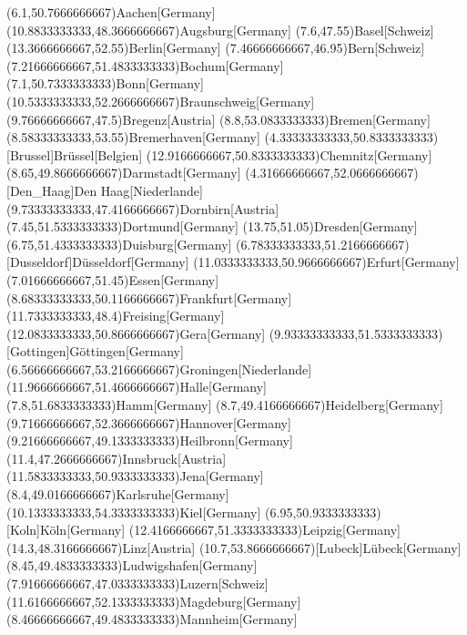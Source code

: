 \mapputIIID[30](6.1,50.7666666667){Aachen}[Germany]
\mapputIIID(10.8833333333,48.3666666667){Augsburg}[Germany]
\mapputIIID[165](7.6,47.55){Basel}[Schweiz]
\mapputIIID(13.3666666667,52.55){Berlin}[Germany]
\mapputIIID[0](7.46666666667,46.95){Bern}[Schweiz]
\mapputIIID[-30](7.21666666667,51.4833333333){Bochum}[Germany]
\mapputIIID[180](7.1,50.7333333333){Bonn}[Germany]
\mapputIIID[-90](10.5333333333,52.2666666667){Braunschweig}[Germany]
\mapputIIID(9.76666666667,47.5){Bregenz}[Austria]
\mapputIIID[-90](8.8,53.0833333333){Bremen}[Germany]
\mapputIIID[40](8.58333333333,53.55){Bremerhaven}[Germany]
\mapputIIID(4.33333333333,50.8333333333)[Brussel]{Br\"{u}ssel}[Belgien]
\mapputIIID[0](12.9166666667,50.8333333333){Chemnitz}[Germany]
\mapputIIID[0](8.65,49.8666666667){Darmstadt}[Germany]
\mapputIIID(4.31666666667,52.0666666667)[Den_Haag]{Den Haag}[Niederlande]
\mapputIIID[0](9.73333333333,47.4166666667){Dornbirn}[Austria]
\mapputIIID[0](7.45,51.5333333333){Dortmund}[Germany]
\mapputIIID[40](13.75,51.05){Dresden}[Germany]
\mapputIIID[180](6.75,51.4333333333){Duisburg}[Germany]
\mapputIIID[180](6.78333333333,51.2166666667)[Dusseldorf]{D\"{u}sseldorf}[Germany]
\mapputIIID(11.0333333333,50.9666666667){Erfurt}[Germany]
\mapputIIID[-60](7.01666666667,51.45){Essen}[Germany]
\mapputIIID(8.68333333333,50.1166666667){Frankfurt}[Germany]
\mapputIIID(11.7333333333,48.4){Freising}[Germany]
\mapputIIID(12.0833333333,50.8666666667){Gera}[Germany]
\mapputIIID(9.93333333333,51.5333333333)[Gottingen]{G\"{o}ttingen}[Germany]
\mapputIIID(6.56666666667,53.2166666667){Groningen}[Niederlande]
\mapputIIID(11.9666666667,51.4666666667){Halle}[Germany]
\mapputIIID(7.8,51.6833333333){Hamm}[Germany]
\mapputIIID[-10](8.7,49.4166666667){Heidelberg}[Germany]
\mapputIIID[200](9.71666666667,52.3666666667){Hannover}[Germany]
\mapputIIID[0](9.21666666667,49.1333333333){Heilbronn}[Germany]
\mapputIIID(11.4,47.2666666667){Innsbruck}[Austria]
\mapputIIID(11.5833333333,50.9333333333){Jena}[Germany]
\mapputIIID(8.4,49.0166666667){Karlsruhe}[Germany]
\mapputIIID[-90](10.1333333333,54.3333333333){Kiel}[Germany]
\mapputIIID[0](6.95,50.9333333333)[Koln]{K\"{o}ln}[Germany]
\mapputIIID(12.4166666667,51.3333333333){Leipzig}[Germany]
\mapputIIID(14.3,48.3166666667){Linz}[Austria]
\mapputIIID[0](10.7,53.8666666667)[Lubeck]{L\"{u}beck}[Germany]
\mapputIIID[180](8.45,49.4833333333){Ludwigshafen}[Germany]
\mapputIIID(7.91666666667,47.0333333333){Luzern}[Schweiz]
\mapputIIID[0](11.6166666667,52.1333333333){Magdeburg}[Germany]
\mapputIIID[30](8.46666666667,49.4833333333){Mannheim}[Germany]
